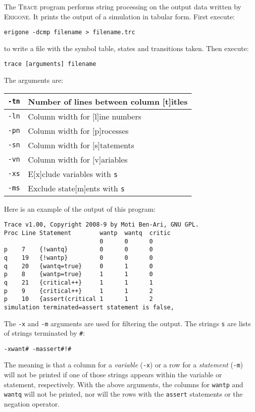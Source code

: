 \documentclass[11pt]{article}
\newcommand*{\prg}{\textsc{Erigone}}
\newcommand*{\trc}{\textsc{Trace}}
\newcommand*{\p}[1]{\texttt{#1}}
\begin{document}
The \trc{} program performs string processing on the output data written
by \prg{}. It prints the output of a simulation in tabular form. First
execute:
\begin{verbatim}
erigone -dcmp filename > filename.trc
\end{verbatim}
to write a file with the symbol table, states and transitions
taken. Then execute:
\begin{verbatim}
trace [arguments] filename
\end{verbatim}
The arguments are:
\begin{center}
\begin{tabular}{|l|l|}
\hline
\p{-tn} & Number of lines between column [t]itles\\\hline\hline
\p{-ln} & Column width for [l]ine numbers\\\hline
\p{-pn} & Column width for [p]rocesses\\\hline
\p{-sn} & Column width for [s]tatements\\\hline
\p{-vn} & Column width for [v]ariables\\\hline\hline
\p{-xs} & E[x]clude variables with \p{s}\\\hline
\p{-ms} & Exclude state[m]ents with \p{s}\\\hline
\end{tabular}
\end{center}
Here is an example of the output of this program:
\begin{footnotesize}
\begin{verbatim}
Trace v1.00, Copyright 2008-9 by Moti Ben-Ari, GNU GPL.
Proc Line Statement        wantp  wantq  critic 
                           0      0      0      
p    7    {!wantq}         0      0      0      
q    19   {!wantp}         0      0      0      
q    20   {wantq=true}     0      1      0      
p    8    {wantp=true}     1      1      0      
q    21   {critical++}     1      1      1      
p    9    {critical++}     1      1      2      
p    10   {assert(critical 1      1      2      
simulation terminated=assert statement is false,
\end{verbatim}
\end{footnotesize}

The \p{-x} and \p{-m} arguments are used for filtering the output.
The strings \p{s} are lists of strings terminated by \p{\#}:
\begin{verbatim}
-xwant# -massert#!#
\end{verbatim}

The meaning is that a column for a \emph{variable} (\p{-x}) or a row for
a \emph{statement} (\p{-m}) will not be printed if one of those strings
appears within the variable or statement, respectively. With the above
arguments, the columns for \p{wantp} and \p{wantq} will not be printed,
nor will the rows with the \p{assert} statements or the negation
operator.
\end{document}

